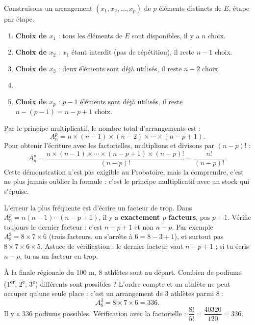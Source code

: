 \documentclass[11pt]{article}
\def\vdots{\mathord{\vbox{\baselineskip3.2pt\lineskiplimit0pt\kern4pt\hbox{.}\hbox{.}\hbox{.}}}}%
\begin{document}
\begin{experience}
Construisons un arrangement $(x_1, x_2, \ldots, x_p)$ de $p$ éléments distincts de $E$, étape par étape.
\begin{enumerate}
\item \textbf{Choix de $x_1$} : tous les éléments de $E$ sont disponibles, il y a $n$ choix.
\item \textbf{Choix de $x_2$} : $x_1$ étant interdit (pas de répétition), il reste $n-1$ choix.
\item \textbf{Choix de $x_3$} : deux éléments sont déjà utilisés, il reste $n-2$ choix.
\item[$\vdots$]
\item \textbf{Choix de $x_p$} : $p-1$ éléments sont déjà utilisés, il reste $n-(p-1) = n-p+1$ choix.
\end{enumerate}
Par le principe multiplicatif, le nombre total d'arrangements est :
\[ A_n^p = n \times (n-1) \times (n-2) \times \cdots \times (n-p+1). \]
Pour obtenir l'écriture avec les factorielles, multiplions et divisons par $(n-p)!$ :
\[ A_n^p = \frac{n \times (n-1) \times \cdots \times (n-p+1) \times (n-p)!}{(n-p)!} = \frac{n!}{(n-p)!}. \]
Cette démonstration n'est pas exigible au Probatoire, mais la comprendre, c'est ne plus jamais oublier la formule : c'est le principe multiplicatif avec un stock qui s'épuise.
\end{experience}

\begin{attention}
L'erreur la plus fréquente est d'écrire un facteur de trop. Dans $A_n^p = n(n-1)\cdots(n-p+1)$, il y a \textbf{exactement $p$ facteurs}, pas $p+1$. Vérifie toujours le dernier facteur : c'est $n-p+1$ et non $n-p$.
Par exemple $A_8^3 = 8 \times 7 \times 6$ (trois facteurs, on s'arrête à $6 = 8-3+1$), et surtout pas $8 \times 7 \times 6 \times 5$.
Astuce de vérification : le dernier facteur vaut $n-p+1$ ; si tu écris $n-p$, tu as un facteur en trop.
\end{attention}

\begin{exemplebox}
À la finale régionale du 100 m, 8 athlètes sont au départ. Combien de podiums (1\textsuperscript{er}, 2\textsuperscript{e}, 3\textsuperscript{e}) différents sont possibles ?
L'ordre compte et un athlète ne peut occuper qu'une seule place : c'est un arrangement de $3$ athlètes parmi $8$ :
\[ A_8^3 = 8 \times 7 \times 6 = 336. \]
Il y a $336$ podiums possibles. Vérification avec la factorielle : $\dfrac{8!}{5!} = \dfrac{\num{40320}}{120} = 336$.
\end{exemplebox}
\end{document}
